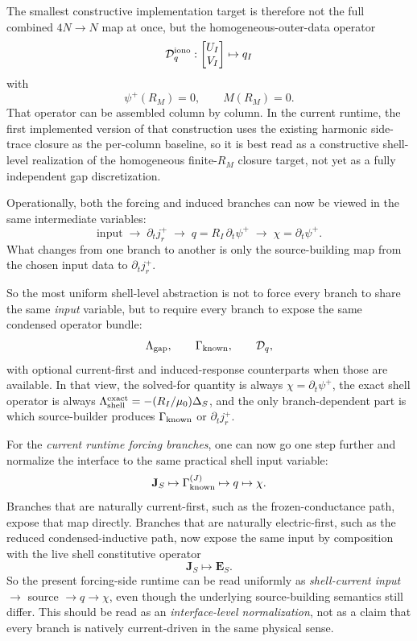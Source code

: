\documentclass[11pt,a4paper]{article}
\begin{document}
The smallest constructive implementation target is therefore not the full
combined \(4N\to N\) map at once, but the homogeneous-outer-data operator
\[
\mathcal D_q^{\rm iono}:
\begin{bmatrix}
U_I\\
V_I
\end{bmatrix}
\mapsto q_I
\]
with
\[
\psi^+(R_M)=0,
\qquad
M(R_M)=0.
\]
That operator can be assembled column by column. In the current runtime, the
first implemented version of that construction uses the existing harmonic
side-trace closure as the per-column baseline, so it is best read as a
constructive shell-level realization of the homogeneous finite-\(R_M\)
closure target, not yet as a fully independent gap discretization.

Operationally, both the forcing and induced branches can now be viewed in the
same intermediate variables:
\[
\text{input}
\;\to\;
\partial_t j_r^+
\;\to\;
q=R_I\,\partial_t\psi^+
\;\to\;
\chi=\partial_t\psi^+.
\]
What changes from one branch to another is only the source-building map from
the chosen input data to \(\partial_t j_r^+\).

So the most uniform shell-level abstraction is not to force every branch to
share the same \emph{input} variable, but to require every branch to expose
the same condensed operator bundle:
\[
\Lambda_{\rm gap},
\qquad
\Gamma_{\rm known},
\qquad
\mathcal D_q,
\]
with optional current-first and induced-response counterparts when those are
available. In that view, the solved-for quantity is always
\(\chi=\partial_t\psi^+\), the exact shell operator is always
\(\Lambda_{\rm shell}^{\rm exact}=-(R_I/\mu_0)\Delta_S\), and the only
branch-dependent part is which source-builder produces
\(\Gamma_{\rm known}\) or \(\partial_t j_r^+\).

For the \emph{current runtime forcing branches}, one can now go one step
further and normalize the interface to the same practical shell input
variable:
\[
\mathbf J_S \mapsto \Gamma_{\rm known}^{(J)} \mapsto q \mapsto \chi.
\]
Branches that are naturally current-first, such as the frozen-conductance
path, expose that map directly. Branches that are naturally electric-first,
such as the reduced condensed-inductive path, now expose the same input by
composition with the live shell constitutive operator
\[
\mathbf J_S \mapsto \mathbf E_S.
\]
So the present forcing-side runtime can be read uniformly as
\emph{shell-current input} \(\to\) source \(\to q \to \chi\), even though the
underlying source-building semantics still differ. This should be read as an
\emph{interface-level normalization}, not as a claim that every branch is
natively current-driven in the same physical sense.
\end{document}
